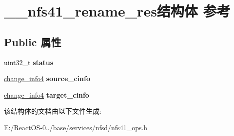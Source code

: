 \hypertarget{struct____nfs41__rename__res}{}\section{\+\_\+\+\_\+nfs41\+\_\+rename\+\_\+res结构体 参考}
\label{struct____nfs41__rename__res}
\subsection*{Public 属性}
\begin{DoxyCompactItemize}
\item 
\mbox{\label{struct____nfs41__rename__res_a94ce00f11194ef84fe757de667ee49c4}} 
uint32\+\_\+t {\bfseries status}
\item 
\mbox{\label{struct____nfs41__rename__res_a7d6f2889afaad33cb57fb98326f8bc27}} 
\hyperlink{struct____change__info4}{change\+\_\+info4} {\bfseries source\+\_\+cinfo}
\item 
\mbox{\label{struct____nfs41__rename__res_a545b5ea7899cbe1f40d51666667a424a}} 
\hyperlink{struct____change__info4}{change\+\_\+info4} {\bfseries target\+\_\+cinfo}
\end{DoxyCompactItemize}


该结构体的文档由以下文件生成\+:\begin{DoxyCompactItemize}
\item 
E\+:/\+React\+O\+S-\/0../base/services/nfsd/nfs41\+\_\+ops.\+h\end{DoxyCompactItemize}

